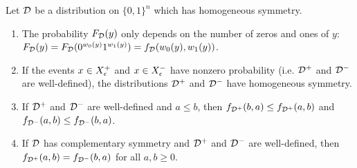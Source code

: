 \begin{lemma}
\label{lem:symproperties}
Let $\mathcal{D}$ be a distribution on $\{0, 1\}^n$ which has homogeneous symmetry.

\begin{enumerate}
    \item The probability $F_{\mathcal{D}}(y)$ only depends on the number of zeros and ones
    of $y$: $F_{\mathcal{D}}(y) = F_{\mathcal{D}}(0^{w_0(y)}1^{w_1(y)}) = f_{\mathcal{D}}(w_0(y), w_1(y))$. 
    \item If the events $x \in X^+_\epsilon$ and $x \in X^-_\epsilon$ have nonzero probability
    (i.e. $\mathcal{D}^+$ and $\mathcal{D}^-$ are well-defined),
    the distributions $\mathcal{D}^+$ and $\mathcal{D}^-$ have homogeneous symmetry. 
    \item If $\mathcal{D}^+$ and $\mathcal{D}^-$ are well-defined and $a \leq b$, then $f_{\mathcal{D}^+}(b, a) \leq f_{\mathcal{D}^+}(a, b)$
    and $f_{\mathcal{D}^-}(a, b) \leq f_{\mathcal{D}^-}(b, a)$.
    \item If $\mathcal{D}$ has complementary symmetry and $\mathcal{D}^+$ and $\mathcal{D}^-$ are well-defined, then  
    $f_{\mathcal{D}^+}(a, b) = f_{\mathcal{D}^-}(b, a)$ for all
    $a, b \geq 0$.
\end{enumerate}
\end{lemma}

